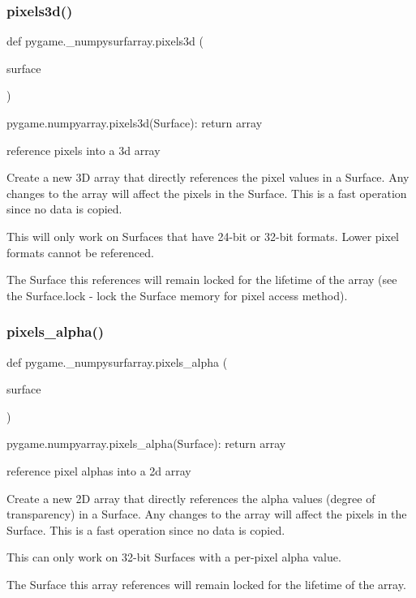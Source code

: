 \subsubsection{\texorpdfstring{pixels3d()}{pixels3d()}}
{\footnotesize\ttfamily def pygame.\+\_\+numpysurfarray.\+pixels3d (\begin{DoxyParamCaption}\item[{}]{surface }\end{DoxyParamCaption})}

\begin{DoxyVerb}pygame.numpyarray.pixels3d(Surface): return array

reference pixels into a 3d array

Create a new 3D array that directly references the pixel values in a
Surface. Any changes to the array will affect the pixels in the
Surface. This is a fast operation since no data is copied.

This will only work on Surfaces that have 24-bit or 32-bit
formats. Lower pixel formats cannot be referenced.

The Surface this references will remain locked for the lifetime of
the array (see the Surface.lock - lock the Surface memory for pixel
access method).
\end{DoxyVerb}
 \mbox{\label{namespacepygame_1_1__numpysurfarray_a648f263161e021fa6f1fe4b2d2bd53f5}} 
\subsubsection{\texorpdfstring{pixels\+\_\+alpha()}{pixels\_alpha()}}
{\footnotesize\ttfamily def pygame.\+\_\+numpysurfarray.\+pixels\+\_\+alpha (\begin{DoxyParamCaption}\item[{}]{surface }\end{DoxyParamCaption})}

\begin{DoxyVerb}pygame.numpyarray.pixels_alpha(Surface): return array

reference pixel alphas into a 2d array

Create a new 2D array that directly references the alpha values
(degree of transparency) in a Surface. Any changes to the array will
affect the pixels in the Surface. This is a fast operation since no
data is copied.

This can only work on 32-bit Surfaces with a per-pixel alpha value.

The Surface this array references will remain locked for the
lifetime of the array.
\end{DoxyVerb}
 \mbox{\label{namespacepygame_1_1__numpysurfarray_a238bd95d18d3e5fb3efe3e09fdfa11c7}} 
